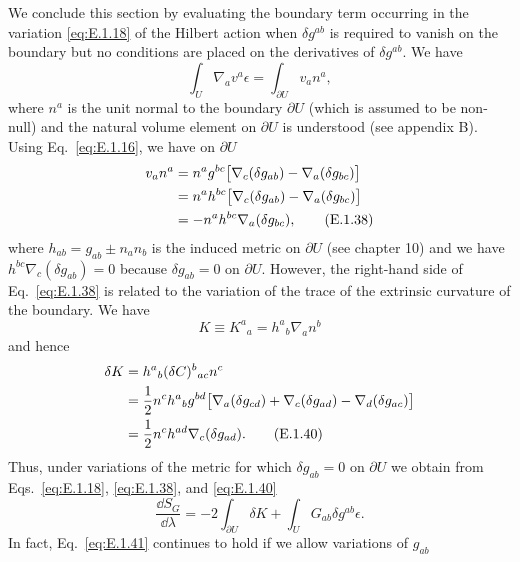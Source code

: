 We conclude this section by evaluating the boundary term occurring in the variation
\eqref{eq:E.1.18} of the Hilbert action when \(\delta g^{ab}\) is required to vanish
on the boundary but no conditions are placed on the derivatives of \(\delta g^{ab}\).
We have
\begin{equation}
  \int_U\nabla_a v^a\epsilon=\int_{\partial U}v_an^a,
  \tag{E.1.37}\label{eq:E.1.37}
\end{equation}
where \(n^a\) is the unit normal to the boundary \(\partial U\) (which is assumed to
be non-null) and the natural volume element on \(\partial U\) is understood (see
appendix B). Using Eq.~\eqref{eq:E.1.16}, we have on \(\partial U\)
\begin{align}
  v_an^a
    &=n^ag^{bc}\bigl[\nabla_c(\delta g_{ab})
      -\nabla_a(\delta g_{bc})\bigr]\notag\\
    &=n^ah^{bc}\bigl[\nabla_c(\delta g_{ab})
      -\nabla_a(\delta g_{bc})\bigr]\notag\\
    &=-n^ah^{bc}\nabla_a(\delta g_{bc}),
  \tag{E.1.38}\label{eq:E.1.38}
\end{align}
where \(h_{ab}=g_{ab}\pm n_an_b\) is the induced metric on \(\partial U\) (see
chapter 10) and we have \(h^{bc}\nabla_c(\delta g_{ab})=0\) because
\(\delta g_{ab}=0\) on \(\partial U\). However, the right-hand side of
Eq.~\eqref{eq:E.1.38} is related to the variation of the trace of the extrinsic
curvature of the boundary. We have
\begin{equation}
  K\equiv K^a{}_a=h^a{}_b\nabla_a n^b
  \tag{E.1.39}\label{eq:E.1.39}
\end{equation}
and hence
\begin{align}
  \delta K
    &=h^a{}_b(\delta C)^b{}_{ac}n^c\notag\\
    &=\frac{1}{2}n^ch^a{}_bg^{bd}
      \bigl[\nabla_a(\delta g_{cd})
        +\nabla_c(\delta g_{ad})
        -\nabla_d(\delta g_{ac})\bigr]\notag\\
    &=\frac{1}{2}n^ch^{ad}\nabla_c(\delta g_{ad}).
  \tag{E.1.40}\label{eq:E.1.40}
\end{align}
Thus, under variations of the metric for which \(\delta g_{ab}=0\) on
\(\partial U\) we obtain from Eqs.~\eqref{eq:E.1.18}, \eqref{eq:E.1.38}, and
\eqref{eq:E.1.40}
\begin{equation}
  \frac{\dd S_G}{\dd\lambda}
    =-2\int_{\partial U}\delta K+\int_U G_{ab}\delta g^{ab}\epsilon .
  \tag{E.1.41}\label{eq:E.1.41}
\end{equation}
In fact, Eq.~\eqref{eq:E.1.41} continues to hold if we allow variations of \(g_{ab}\)
